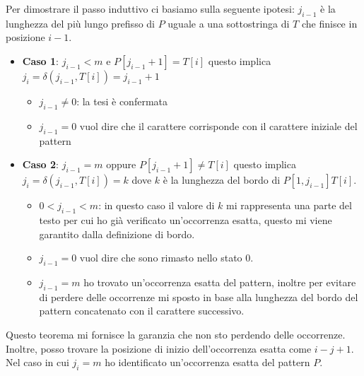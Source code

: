 \begin{dimostrazione}
\begin{enumerate}
        Per dimostrare il passo induttivo ci basiamo sulla seguente ipotesi: $j_{i-1}$ è la lunghezza del più lungo prefisso di $P$ uguale a una sottostringa di $T$ che finisce in posizione $i-1$.
        \begin{itemize}
            \item \textbf{Caso 1}: $j_{i - 1} < m$ e $P[j_{i - 1} + 1] = T[i]$ questo implica $j_i = \delta(j_{i - 1}, T[i]) = j_{i - 1} + 1$
            \begin{itemize}
                \item $j_{i - 1} \neq 0$: la tesi è confermata
                \item $j_{i - 1} = 0$ vuol dire che il carattere corrisponde con il carattere iniziale del pattern
            \end{itemize}
            \item \textbf{Caso 2}: $j_{i - 1} = m$ oppure $P[j_{i - 1} + 1] \neq T[i]$ questo implica $j_i = \delta(j_{i - 1}, T[i]) = k$ dove $k$ è la lunghezza del bordo di $P[1, j_{i - 1}]T[i]$.
            \begin{itemize}
                \item $0 < j_{i - 1} < m$: in questo caso il valore di $k$ mi rappresenta una parte del testo per cui ho già verificato un'occorrenza esatta, questo mi viene garantito dalla definizione di bordo.
                \item $j_{i - 1} = 0$ vuol dire che sono rimasto nello stato 0.
                \item $j_{i - 1} = m$ ho trovato un’occorrenza esatta del pattern, inoltre per evitare di perdere delle occorrenze mi sposto in base alla lunghezza del bordo del pattern concatenato con il carattere successivo.
            \end{itemize}
        \end{itemize}
    \end{enumerate}
\end{dimostrazione}
Questo teorema mi fornisce la garanzia che non sto perdendo delle occorrenze. Inoltre, posso trovare la posizione di inizio dell'occorrenza esatta come $i - j + 1$. Nel caso in cui $j_i = m$ ho identificato un'occorrenza esatta del pattern $P$.

